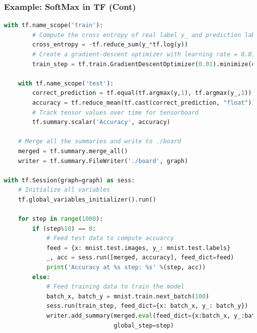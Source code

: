 \begin{frame}[fragile]
  \MyLogo
  \frametitle{Example: SoftMax in TF (Cont)}  

\ContinueLineNumber
\begin{lstlisting}[language=python]
	with tf.name_scope('train'):
		# Compute the cross entropy of real label y_ and prediction labe y
		cross_entropy = -tf.reduce_sum(y_*tf.log(y))
		# Create a gradient-descent optimizer with learning rate = 0.01
		train_step = tf.train.GradientDescentOptimizer(0.01).minimize(cross_entropy)

	with tf.name_scope('test'):
		correct_prediction = tf.equal(tf.argmax(y,1), tf.argmax(y_,1))
		accuracy = tf.reduce_mean(tf.cast(correct_prediction, "float"))
		# Track tensor values over time for tensorboard
		tf.summary.scalar('Accuracy', accuracy)
	
	# Merge all the summaries and write to ./board
	merged = tf.summary.merge_all()
	writer = tf.summary.FileWriter('./board', graph)
	
with tf.Session(graph=graph) as sess:
	# Initialize all variables
	tf.global_variables_initializer().run()
	
	for step in range(1000):
		if (step%10) == 0:
			# Feed test data to compute accuarcy
			feed = {x: mnist.test.images, y_: mnist.test.labels}
			_, acc = sess.run([merged, accuracy], feed_dict=feed)
			print('Accuracy at %s step: %s' %(step, acc))
		else:
			# Feed training data to train the model
			batch_x, batch_y = mnist.train.next_batch(100)
			sess.run(train_step, feed_dict={x: batch_x, y_: batch_y})
			writer.add_summary(merged.eval(feed_dict={x:batch_x, y_:batch}),
							   global_step=step)
\end{lstlisting}

\end{frame}
